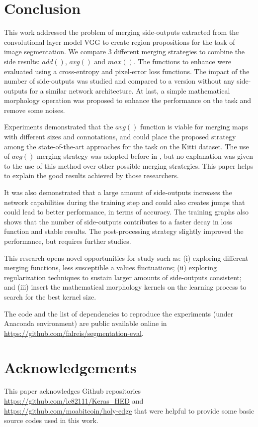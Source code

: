 \section{Conclusion}
\label{sec:conclusion}

This work addressed the problem of merging side-outputs extracted from the convolutional layer model VGG to create region propositions for the task of image segmentation. We compare 3 different merging strategies to combine the side results: $add()$, $avg()$ and $max()$. The functions to enhance were evaluated using a cross-entropy and pixel-error loss functions. The impact of the number of side-outputs was studied and compared to a version without any side-outputs for a similar network architecture. At last, a simple mathematical morphology operation was proposed to  enhance the performance on the task and remove some noises. 

Experiments demonstrated that the $avg()$ function is viable for merging maps with different sizes and connotations, and could place the proposed strategy among the state-of-the-art approaches for the task on the Kitti dataset. The use of $avg()$ merging strategy was adopted before in \cite{liu2017}, but no explanation was given to the use of this method over other possible merging strategies. This paper helps to explain the good results achieved by those researchers.

It was also demonstrated that a large amount of side-outputs increases the network capabilities during the training step and could also creates jumps that could lead to better performance, in terms of accuracy. The training graphs also shows that the number of side-outputs contributes to a faster decay in loss function and stable results. The post-processing strategy slightly improved the performance, but requires further studies.

This research opens novel opportunities for study such as: (i) exploring different merging functions, less susceptible a values fluctuations;  (ii) exploring regularization techniques to sustain larger amounts of side-outputs consistent; and (iii) insert the mathematical morphology kernels on the learning process to search for the best kernel size. 
 
The code and the list of dependencies to reproduce the experiments (under Anaconda environment) are public available online in \url{https://github.com/falreis/segmentation-eval}. 

\section{Acknowledgements}
\label{sec:acknowledgements}

This paper acknowledges Github repositories \url{https://github.com/lc82111/Keras_HED} and \url{https://github.com/moabitcoin/holy-edge} that were helpful to provide some basic source codes used in this work.
